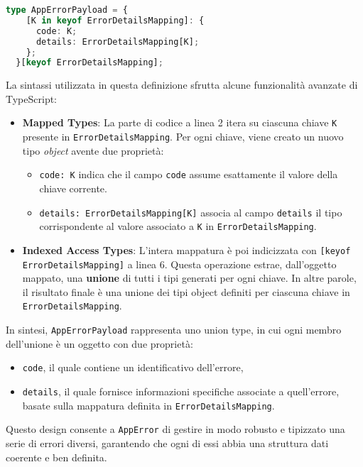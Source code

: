 \newpage
\begin{lstlisting}[language=typescript, caption={Definizione del tipo \texttt{AppErrorPayload}}, label={lst:appErrorPayload}]
  type AppErrorPayload = {
    [K in keyof ErrorDetailsMapping]: {
      code: K;
      details: ErrorDetailsMapping[K];
    };
  }[keyof ErrorDetailsMapping];
\end{lstlisting}
La sintassi utilizzata in questa definizione sfrutta alcune funzionalità avanzate di TypeScript:
\begin{itemize}
  \item \textbf{Mapped Types}: La parte di codice a linea 2 itera su ciascuna chiave \texttt{K} presente in \texttt{ErrorDetailsMapping}. Per ogni chiave, viene creato un nuovo tipo \textit{object} avente due proprietà:
    \begin{itemize}
      \item \texttt{code: K} indica che il campo \texttt{code} assume esattamente il valore della chiave corrente.
      \item \texttt{details: ErrorDetailsMapping[K]} associa al campo \texttt{details} il tipo corrispondente al valore associato a \texttt{K} in \texttt{ErrorDetailsMapping}.
    \end{itemize}

  \item \textbf{Indexed Access Types}: L'intera mappatura è poi indicizzata con \texttt{[keyof ErrorDetailsMapping]} a linea 6. Questa operazione estrae, dall'oggetto mappato, una \textbf{unione} di tutti i tipi generati per ogni chiave. In altre parole, il risultato finale è una unione dei tipi object definiti per ciascuna chiave in \texttt{ErrorDetailsMapping}.
\end{itemize}

In sintesi, \texttt{AppErrorPayload} rappresenta uno union type, in cui ogni membro dell'unione è un oggetto con due proprietà:
\begin{itemize}
  \item \texttt{code}, il quale contiene un identificativo dell'errore,
  \item \texttt{details}, il quale fornisce informazioni specifiche associate a quell'errore, basate sulla mappatura definita in \texttt{ErrorDetailsMapping}.
\end{itemize}

Questo design consente a \texttt{AppError} di gestire in modo robusto e tipizzato una serie di errori diversi, garantendo che ogni di essi abbia una struttura dati coerente e ben definita.
